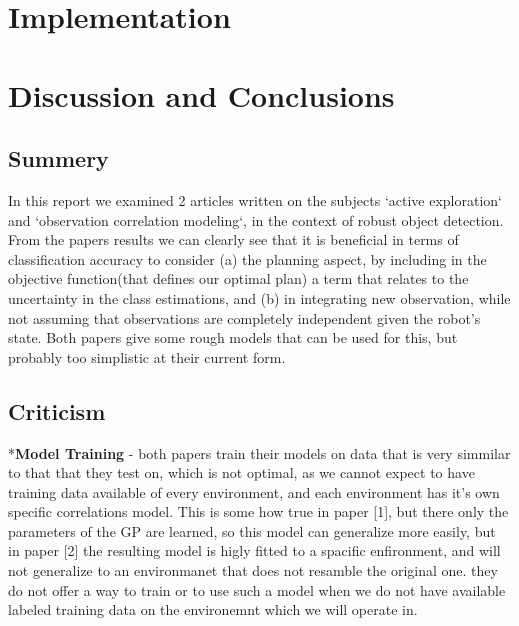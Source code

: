 \documentclass{article}
\begin{document}
	\section{Implementation}
	
	\section{Discussion and Conclusions}
	\subsection{Summery}
	In this report we examined 2 articles written on the subjects `active exploration` and `observation correlation modeling`,
	in the context of robust object detection. From the papers results we can clearly see that it is beneficial in terms of classification accuracy to consider (a) the planning aspect, by including in the objective function(that defines our optimal plan) a term that relates to the uncertainty in the class estimations, and (b) in integrating new observation, while not assuming that observations are completely independent given the robot's state. Both papers give some rough models that can be used for this, but probably too simplistic at their current form.
	
	
	\subsection{Criticism}
	*\textbf{Model Training} - both papers train their models on data that is very simmilar to that that they test on, 
	which is not optimal, as we cannot expect to have training data available of every environment, and each environment has it's own specific correlations model. This is some how true in paper [1], but there only the parameters of the GP are learned, so this model can generalize more easily, but in paper [2] the resulting model is higly fitted to a spacific enfironment, and will not generalize to an environmanet that does not resamble the original one. they do not offer a way to train or to use such a model when we do not have available labeled training data on the environemnt which we will operate in. 	
	
\end{document}
